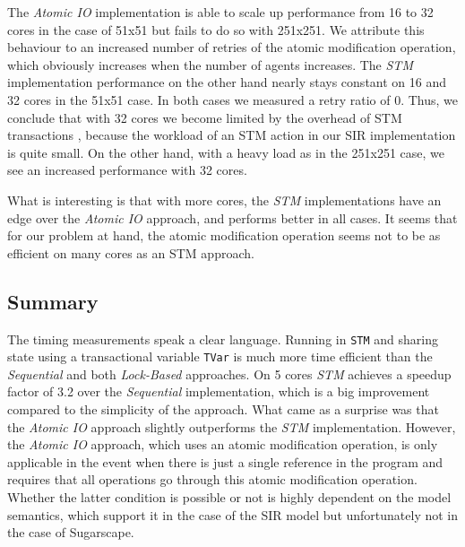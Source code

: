 The \textit{Atomic IO} implementation is able to scale up performance from 16 to 32 cores in the case of 51x51 but fails to do so with 251x251. We attribute this behaviour to an increased number of retries of the atomic modification operation, which obviously increases when the number of agents increases. The \textit{STM} implementation performance on the other hand nearly stays constant on 16 and 32 cores in the 51x51 case. In both cases we measured a retry ratio of 0. Thus, we conclude that with 32 cores we become limited by the overhead of STM transactions \cite{perfumo_limits_2008}, because the workload of an STM action in our SIR implementation is quite small. On the other hand, with a heavy load as in the 251x251 case, we see an increased performance with 32 cores.

What is interesting is that with more cores, the \textit{STM} implementations have an edge over the \textit{Atomic IO} approach, and performs better in all cases. It seems that for our problem at hand, the atomic modification operation seems not to be as efficient on many cores as an STM approach. 

%

\subsection{Summary}
The timing measurements speak a clear language. Running in \texttt{STM} and sharing state using a transactional variable \texttt{TVar} is much more time efficient than the \textit{Sequential} and both \textit{Lock-Based} approaches. On 5 cores \textit{STM} achieves a speedup factor of 3.2 over the \textit{Sequential} implementation, which is a big improvement compared to the simplicity of the approach. What came as a surprise was that the \textit{Atomic IO} approach slightly outperforms the \textit{STM} implementation. However, the \textit{Atomic IO} approach, which uses an atomic modification operation, is only applicable in the event when there is just a single reference in the program and requires that all operations go through this atomic modification operation. Whether the latter condition is possible or not is highly dependent on the model semantics, which support it in the case of the SIR model but unfortunately not in the case of Sugarscape.

